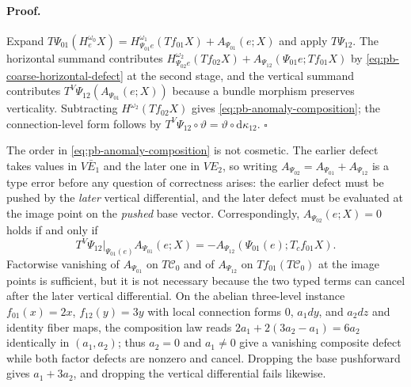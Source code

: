 \paragraph{Proof.}
Expand
$T\Psi_{01}(H^{\omega_0}_eX)
=H^{\omega_1}_{\Psi_{01}e}(Tf_{01}X)+A_{\Psi_{01}}(e;X)$
and apply $T\Psi_{12}$.  The horizontal summand contributes
$H^{\omega_2}_{\Psi_{02}e}(Tf_{02}X)+A_{\Psi_{12}}(\Psi_{01}e;Tf_{01}X)$ by
\eqref{eq:pb-coarse-horizontal-defect} at the second stage, and the vertical
summand contributes $T^V\Psi_{12}(A_{\Psi_{01}}(e;X))$ because a bundle
morphism preserves verticality.  Subtracting
$H^{\omega_2}(Tf_{02}X)$ gives \eqref{eq:pb-anomaly-composition}; the
connection-level form follows by
$T^V\Psi_{12}\circ\vartheta=\vartheta\circ\mathrm d\kappa_{12}$.  $\square$

The order in \eqref{eq:pb-anomaly-composition} is not cosmetic.  The earlier
defect takes values in $V\bar E_1$ and the later one in $VE_2$, so writing
$A_{\Psi_{02}}=A_{\Psi_{01}}+A_{\Psi_{12}}$ is a type error before any question
of correctness arises: the earlier defect must be pushed by the \emph{later}
vertical differential, and the later defect must be evaluated at the image point
on the \emph{pushed} base vector.  Correspondingly,
  $A_{\Psi_{02}}(e;X)=0$ holds if and only if
  \begin{equation}
  T^V\Psi_{12}\big|_{\Psi_{01}(e)}A_{\Psi_{01}}(e;X)
  =-A_{\Psi_{12}}\left(\Psi_{01}(e);T_cf_{01}X\right).
  \label{eq:pb-anomaly-composition-vanishing}
  \end{equation}
  Factorwise vanishing of $A_{\Psi_{01}}$ on $T\mathcal C_0$ and of
  $A_{\Psi_{12}}$ on $Tf_{01}(T\mathcal C_0)$ at the image points is sufficient,
  but it is not necessary because the two typed terms can cancel after the
  later vertical differential.  On the abelian three-level instance
  $f_{01}(x)=2x$, $f_{12}(y)=3y$ with local
connection forms $0$, $a_1dy$, and $a_2dz$ and identity fiber maps, the
  composition law reads $2a_1+2(3a_2-a_1)=6a_2$ identically in $(a_1,a_2)$;
  thus $a_2=0$ and $a_1\ne0$ give a vanishing composite defect while both
  factor defects are nonzero and cancel.  Dropping the base pushforward gives
  $a_1+3a_2$, and dropping the vertical differential fails likewise.

